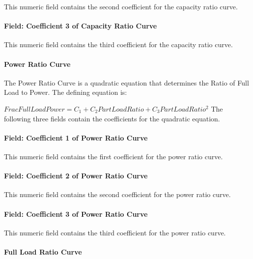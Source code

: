 This numeric field contains the second coefficient for the capacity ratio curve.

\paragraph{Field: Coefficient 3 of Capacity Ratio Curve}\label{field-coefficient-3-of-capacity-ratio-curve-2}

This numeric field contains the third coefficient for the capacity ratio curve.

\paragraph{Power Ratio Curve}\label{power-ratio-curve-2}

The Power Ratio Curve is a quadratic equation that determines the Ratio of Full Load to Power. The defining equation is:

\(FracFullLoadPower = {C_1} + {C_2}PartLoadRatio + {C_3}PartLoadRati{o^2}\) The following three fields contain the coefficients for the quadratic equation.

\paragraph{Field: Coefficient 1 of Power Ratio Curve}\label{field-coefficient-1-of-power-ratio-curve-1}

This numeric field contains the first coefficient for the power ratio curve.

\paragraph{Field: Coefficient 2 of Power Ratio Curve}\label{field-coefficient-2-of-power-ratio-curve-2}

This numeric field contains the second coefficient for the power ratio curve.

\paragraph{Field: Coefficient 3 of Power Ratio Curve}\label{field-coefficient-3-of-power-ratio-curve-2}

This numeric field contains the third coefficient for the power ratio curve.

\paragraph{Full Load Ratio Curve}\label{full-load-ratio-curve-2}

